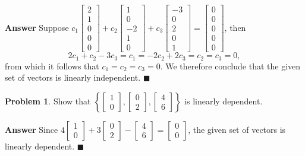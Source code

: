 \documentclass[12pt,letterpaper]{book}
\numberwithin{equation}{section}
\theoremstyle{definition}
\newtheorem{problem}[thm]{\textbf{Problem}}
\newenvironment{answer}{\noindent\textbf{Answer}}{\hfill$\blacksquare$\vspace{0.1in}}
\begin{document}
\begin{answer}
Suppose $c_1\left[\begin{array}{r} 2 \\ 1
\\ 0 \\ 0 \\ 0 \end{array}\right]+c_2\left[\begin{array}{r} 1 \\ 0
\\ -2 \\ 1 \\ 0 \end{array}\right]+c_3\left[\begin{array}{r} -3 \\ 0
\\ 2 \\ 0 \\ 1 \end{array}\right]=\left[\begin{array}{r} 0 \\ 0
\\ 0 \\ 0 \\ 0 \end{array}\right]$, then
$$2c_1+c_2-3c_3=c_1=-2c_2+2c_3=c_2=c_3=0,$$
from which it follows that $c_1=c_2=c_3=0$. We therefore conclude that the given set of vectors is linearly independent.
\end{answer}

\begin{problem}\label{first lin dep}
Show that $\left\{\left[\begin{array}{r} 1 \\ 0 \end{array}\right],\left[\begin{array}{r} 0 \\ 2
\end{array}\right],\left[\begin{array}{r} 4 \\ 6
\end{array}\right]\right\}$ is linearly dependent.
\end{problem}

\begin{answer}
Since $4\left[\begin{array}{r} 1 \\
0 \end{array}\right]+3\left[\begin{array}{r} 0 \\ 2
\end{array}\right]-\left[\begin{array}{r} 4 \\ 6
\end{array}\right]=\left[\begin{array}{r} 0 \\ 0
\end{array}\right]$, the given set of vectors is linearly dependent.
\end{answer}
\end{document}
